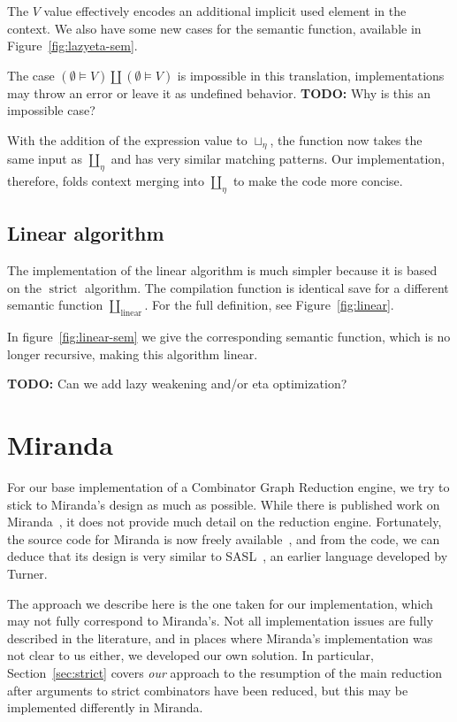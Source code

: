 \documentclass[conference]{IEEEtran}
\DeclareMathOperator{\strict}{strict}
\begin{document}
The $V$ value effectively encodes an additional implicit used element in the context.
We also have some new cases for the semantic function, available in Figure~\ref{fig:lazyeta-sem}.

The case $(\emptyset \models V) \coprod (\emptyset \models V) $ is impossible in this translation, implementations may throw an error or leave it as undefined behavior.
\textbf{TODO:} Why is this an impossible case?

With the addition of the expression value to $\sqcup_\eta$, the function now takes the same input as $\coprod_\eta$ and has very similar matching patterns.
Our implementation, therefore, folds context merging into $\coprod_\eta$ to make the code more concise.

\subsection{Linear algorithm}
The implementation of the linear algorithm is much simpler because it is based on the $\strict$ algorithm.
The compilation function is identical save for a different semantic function $\coprod_{\text{linear}}$.
For the full definition, see Figure~\ref{fig:linear}.

In figure~\ref{fig:linear-sem} we give the corresponding semantic function, which is no longer recursive, making this algorithm linear.

\textbf{TODO: } Can we add lazy weakening and/or eta optimization?

\section{Miranda}
\label{sec:miranda}
For our base implementation of a Combinator Graph Reduction engine, we try to stick to Miranda's design as much as possible.
While there is published work on Miranda~\cite{turner_miranda_1985}, it does not provide much detail on the reduction engine.
Fortunately, the source code for Miranda is now freely available~\cite{turner_open_2021}, and from the code, we can deduce that its design is very similar to SASL~\cite{turner_new_1979}, an earlier language developed by Turner.

The approach we describe here is the one taken for our implementation, which may not fully correspond to Miranda's.
Not all implementation issues are fully described in the literature, and in places where Miranda's implementation was not clear to us either, we developed our own solution.
In particular, Section~\ref{sec:strict} covers \emph{our} approach to the resumption of the main reduction after arguments to strict combinators have been reduced, but this may be implemented differently in Miranda.
\end{document}
